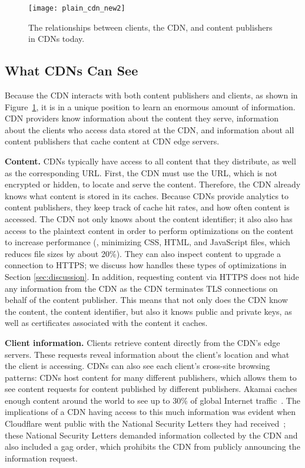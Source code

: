 \begin{figure}[t]
\centering
\texttt{[image: plain\_cdn\_new2]}
\caption{The relationships between clients, the CDN, and content publishers in 
CDNs today.}
\label{fig:basic_cdn}
\end{figure}

\subsection{What CDNs Can See}
\label{sec:info}

Because the CDN interacts with both content publishers and clients, as shown
in Figure~\ref{fig:basic_cdn}, it is in a unique position to learn an
enormous amount of information.  CDN providers know information about the content they serve, information about the clients who access data stored at the CDN, and information about all content publishers that cache content at CDN edge servers.

\textbf{Content.}  CDNs typically have access to all content that they distribute,
as well as 
the corresponding URL.  First, the CDN must use the URL, which is not 
encrypted or hidden, to locate and serve the content. Therefore, 
the CDN already knows what content is
stored in its caches.  Because CDNs provide analytics to content publishers, they
keep track of cache hit 
rates, and how often content is accessed.  The CDN not only knows
about the content identifier; it also also 
has access to the plaintext content in order to perform optimizations on the content
to increase performance (\eg, minimizing CSS, HTML, and JavaScript files, which reduces file sizes by about 20\%).  
They can also inspect content to upgrade a connection to HTTPS; we discuss how 
\system{} handles these types of optimizations
in Section \ref{sec:discussion}. In addition, requesting content via HTTPS does not hide any information 
from the CDN as the CDN terminates TLS connections on behalf of the 
content publisher.  This means that not only does the CDN know the content, the
content identifier, but also it knows 
public and private keys, as well as certificates associated with the content it caches.  

\textbf{Client information.} Clients retrieve content directly from the
CDN's edge servers. These requests reveal
information about the client's location and what the client is accessing.  
CDNs can also see each client's cross-site browsing patterns: CDNs host content
for
many different publishers, which allows 
them to see content requests for content published by different publishers.  Akamai caches enough content around the world to see up to 30\% of global Internet 
traffic~\cite{akamai_global_traffic}.  The implications of a CDN having access to
this much information was evident when Cloudflare
went public with the National Security Letters they had received~\cite{cloudflare_nsl};
these National Security Letters
demanded information collected by the CDN and also included a gag order, which prohibits
the CDN from publicly announcing the information request.  

